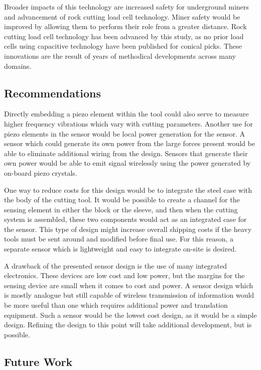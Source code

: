 Broader impacts of this technology are increased safety for underground miners 
and advancement of rock cutting load cell technology.
Miner safety would be improved by allowing them to perform their role from a greater distance.
Rock cutting load cell technology has been advanced by this study, 
as no prior load cells using capacitive technology have been published for conical picks.
These innovations are the result of years of methodical developments across many domains.

\subsection{Recommendations}

Directly embedding a piezo element within the tool could
also serve to measure higher frequency vibrations which vary with cutting parameters.
Another use for piezo elements in the sensor would be local power generation for the sensor. 
A sensor which could generate its own power from the large forces present would be able to 
eliminate additional wiring from the design. Sensors that generate their own power would be able to 
emit signal wirelessly using the power generated by on-board piezo crystals.

One way to reduce costs for this design would be to integrate the steel case with the body of the cutting tool.
It would be possible to create a channel for the sensing element in either the block or the sleeve, and then
when the cutting system is assembled, these two components would act as an integrated case for the sensor.
This type of design might increase overall shipping costs if the heavy tools must be sent around and modified before final use.
For this reason, a separate sensor which is lightweight and easy to integrate on-site is desired.

A drawback of the presented sensor design is the use of many integrated electronics. These devices are low cost and low power,
but the margins for the sensing device are small when it comes to cost and power. A sensor design which is mostly analogue but
still capable of wireless transmission of information would be more useful than one which requires additional power
and translation equipment. Such a sensor would be the lowest cost design, as it would be a simple design.
Refining the design to this point will take additional development, but is possible.

\subsection{Future Work}

